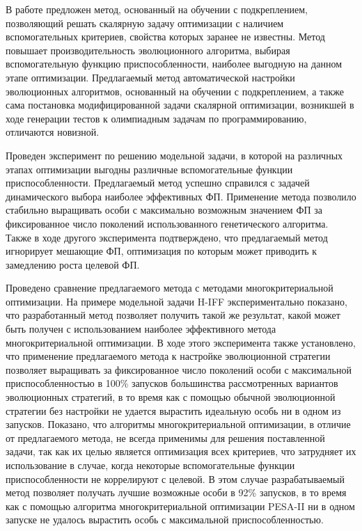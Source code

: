 \startconclusionpage

В работе предложен метод, основанный на обучении с подкреплением, позволяющий решать скалярную задачу оптимизации с наличием вспомогательных критериев, свойства которых заранее не известны. Метод повышает производительность эволюционного алгоритма, выбирая вспомогательную функцию приспособленности, наиболее выгодную на данном этапе оптимизации. Предлагаемый метод автоматической настройки эволюционных алгоритмов, основанный на обучении с подкреплением, а также сама постановка модифицированной задачи скалярной оптимизации, возникшей в ходе генерации тестов к олимпиадным задачам по программированию, отличаются новизной.

Проведен эксперимент по решению модельной задачи, в которой на различных этапах оптимизации выгодны различные вспомогательные функции приспособленности. Предлагаемый метод успешно справился с задачей динамического выбора наиболее эффективных ФП. Применение метода позволило стабильно выращивать особи с максимально возможным значением ФП за фиксированное число поколений использованного генетического алгоритма. Также в ходе другого эксперимента подтверждено, что предлагаемый метод игнорирует мешающие ФП, оптимизация по которым может приводить к замедлению роста целевой ФП.

Проведено сравнение предлагаемого метода с методами многокритериальной оптимизации. На примере модельной задачи H-IFF экспериментально показано, что разработанный метод позволяет получить такой же результат, какой может быть получен с использованием наиболее эффективного метода многокритериальной оптимизации. В ходе этого эксперимента также установлено, что применение предлагаемого метода к настройке эволюционной стратегии позволяет выращивать за фиксированное число поколений особи с максимальной приспособленностью в 100\% запусков большинства рассмотренных вариантов эволюционных стратегий, в то время как с помощью обычной эволюционной стратегии без настройки не удается вырастить идеальную особь ни в одном из запусков. Показано, что алгоритмы многокритериальной оптимизации, в отличие от предлагаемого метода, не всегда применимы для решения поставленной задачи, так как их целью является оптимизация всех критериев, что затрудняет их использование в случае, когда некоторые вспомогательные функции приспособленности не коррелируют с целевой. В этом случае разрабатываемый метод позволяет получать лучшие возможные особи в 92\% запусков, в то время как с помощью алгоритма многокритериальной оптимизации PESA-II ни в одном запуске не удалось вырастить особь с максимальной приспособленностью.

